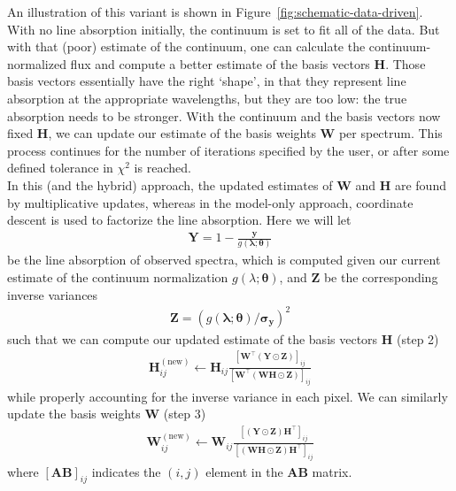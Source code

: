 \documentclass[modern]{aastex631}
\renewcommand{\vec}[1]{\mathbf{#1}}
\newcommand{\vectheta}{\boldsymbol{\theta}}
\newcommand{\vecW}{\mathbf{W}}
\newcommand{\vecH}{\mathbf{H}}
\newcommand{\hadamard}{\odot}
\newcommand{\transpose}{^\top}
\begin{document}
An illustration of this variant is shown in Figure~\ref{fig:schematic-data-driven}. With no line absorption initially, the continuum is set to fit all of the data. But with that (poor) estimate of the continuum, one can calculate the continuum-normalized flux and compute a better estimate of the basis vectors $\vecH$. Those basis vectors essentially have the right `shape', in that they represent line absorption at the appropriate wavelengths, but they are too low: the true absorption needs to be stronger. With the continuum and the basis vectors now fixed $\vecH$, we can update our estimate of the basis weights $\vecW$ per spectrum. This process continues for the number of iterations specified by the user, or after some defined tolerance in $\chi^2$ is reached.\\

In this (and the hybrid) approach, the updated estimates of $\vecW$ and $\vecH$ are found by multiplicative updates, whereas in the model-only approach, coordinate descent is used to factorize the line absorption. Here we will let 
\begin{align}
    \vec{Y} = 1 - \frac{\vec{y}}{g(\vec{\lambda};\vectheta)}
\end{align}
\noindent{}be the line absorption of observed spectra, which is computed given our current estimate of the continuum normalization $g(\lambda; \vectheta)$, and $\vec{Z}$ be the corresponding inverse variances
\begin{align}
    \vec{Z} = \left(g(\vec{\lambda};\vectheta)/\vec{\sigma_{y}}\right)^2 
\end{align}
such that we can compute our updated estimate of the basis vectors $\vecH$ (step 2) 
\begin{align}
    \vecH_{ij}^{\mathrm{(new)}} \leftarrow \vecH_{ij} \frac{\left[\vecW\transpose\left(\vec{Y} \hadamard \vec{Z}\right)\right]_{ij}}{\left[\vecW\transpose\left(\vecW\vecH \hadamard \vec{Z}\right)\right]_{ij}} 
\end{align}
\noindent{}while properly accounting for the inverse variance in each pixel. We can similarly update the basis weights $\vecW$ (step 3)
\begin{align}
    \vecW_{ij}^{\mathrm{(new)}} \leftarrow \vecW_{ij} \frac{\left[\left(\vec{Y} \hadamard \vec{Z}\right)\vecH\transpose\right]_{ij}}{\left[\left(\vecW\vecH\hadamard\vec{Z}\right)\vecH\transpose\right]_{ij}}
\end{align}
\noindent{}where $\left[\vec{AB}\right]_{ij}$ indicates the $(i,j)$ element in the $\vec{AB}$ matrix.\\
\end{document}
